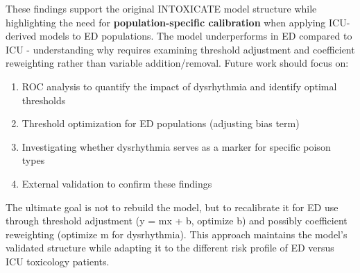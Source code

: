 \documentclass[
]{article}
\providecommand{\tightlist}{%
  \setlength{\itemsep}{0pt}\setlength{\parskip}{0pt}}
\begin{document}
These findings support the original INTOXICATE model structure while highlighting the need for \textbf{population-specific calibration} when applying ICU-derived models to ED populations. The model underperforms in ED compared to ICU - understanding why requires examining threshold adjustment and coefficient reweighting rather than variable addition/removal. Future work should focus on:

\begin{enumerate}
\def\labelenumi{\arabic{enumi}.}
\tightlist
\item
  ROC analysis to quantify the impact of dysrhythmia and identify optimal thresholds
\item
  Threshold optimization for ED populations (adjusting bias term)
\item
  Investigating whether dysrhythmia serves as a marker for specific poison types
\item
  External validation to confirm these findings
\end{enumerate}

The ultimate goal is not to rebuild the model, but to recalibrate it for ED use through threshold adjustment (y = mx + b, optimize b) and possibly coefficient reweighting (optimize m for dysrhythmia). This approach maintains the model's validated structure while adapting it to the different risk profile of ED versus ICU toxicology patients.
\end{document}
